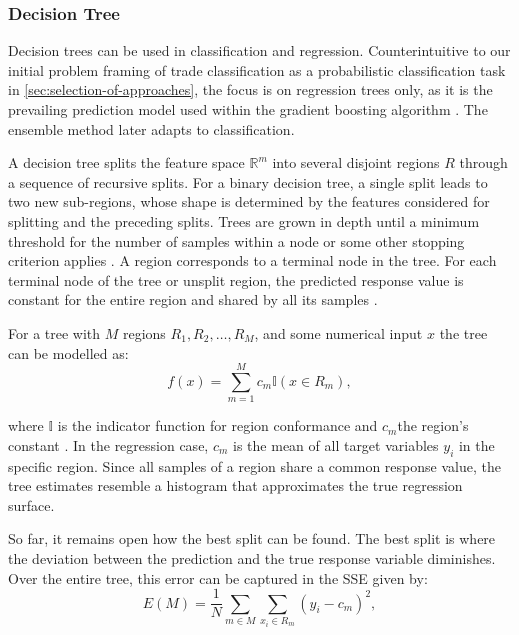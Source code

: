 \subsubsection{Decision Tree}\label{sec:decision-tree}

Decision trees can be used in classification and regression. Counterintuitive to our initial problem framing of trade classification as a probabilistic classification task in \cref{sec:selection-of-approaches}, the focus is on regression trees only, as it is the prevailing prediction model used within the gradient boosting algorithm \autocite[][9]{friedmanAdditiveLogisticRegression2000}. The ensemble method later adapts to classification.

A decision tree splits the feature space $\mathbb{R}^m$ into several disjoint regions $R$ through a sequence of recursive splits. For a binary decision tree, a single split leads to two new sub-regions, whose shape is determined by the features considered for splitting and the preceding splits. Trees are grown in depth until a minimum threshold for the number of samples within a node or some other stopping criterion applies \autocite[][42]{breimanClassificationRegressionTrees2017}.
A region corresponds to a terminal node in the tree. For each terminal node of the tree or unsplit region, the predicted response value is constant for the entire region and shared by all its samples \autocite[][229]{breimanClassificationRegressionTrees2017}.

For a tree with $M$ regions $R_1, R_2,\ldots, R_M$, and some numerical input $x$ the tree can be modelled as:
\begin{equation}
f(x)=\sum_{m=1}^{M} c_{m} \mathbb{I}\left(x \in R_{m}\right),
\label{eq:decision-tree}
\end{equation}

where $\mathbb{I}$ is the indicator function for region conformance and $c_m$the region's constant \autocite[][326]{hastietrevorElementsStatisticalLearning2009}. In the regression case, $c_m$ is the mean of all target variables $y_i$ in the specific region. Since all samples of a region share a common response value, the tree estimates resemble a histogram that approximates the true regression surface.

So far, it remains open how the best split can be found. The best split is where the deviation between the prediction and the true response variable diminishes. Over the entire tree, this error can be captured in the \gls{SSE} given by:
\begin{equation}
E(M)=\frac{1}{N} \sum_{m \in M} \sum_{x_{i} \in R_m}\left(y_{i}-c_{m}\right)^{2},
\end{equation}

